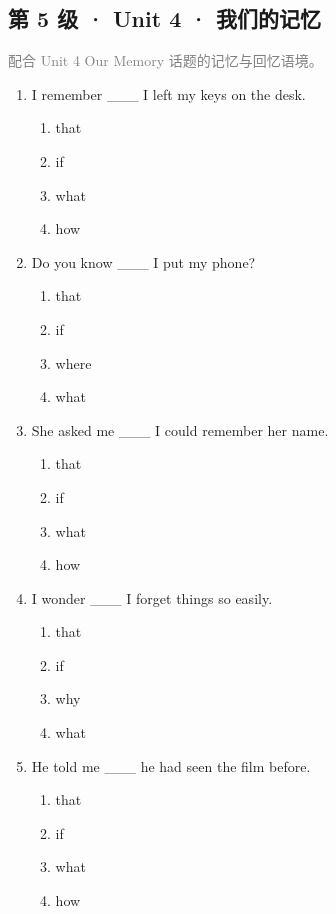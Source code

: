 \documentclass[11pt,a4paper]{ctexart}
\begin{document}
\subsection*{第 5 级 · Unit 4 · 我们的记忆}
\noindent\textcolor{gray}{配合 Unit 4 Our Memory 话题的记忆与回忆语境。}\par\smallskip
\begin{enumerate}[leftmargin=*,itemsep=4pt]
\item I remember \_\_\_ I left my keys on the desk.
\begin{enumerate}[label=\Alph*.,leftmargin=2em,itemsep=1pt,topsep=2pt]
\item that
\item if
\item what
\item how
\end{enumerate}
\item Do you know \_\_\_ I put my phone?
\begin{enumerate}[label=\Alph*.,leftmargin=2em,itemsep=1pt,topsep=2pt]
\item that
\item if
\item where
\item what
\end{enumerate}
\item She asked me \_\_\_ I could remember her name.
\begin{enumerate}[label=\Alph*.,leftmargin=2em,itemsep=1pt,topsep=2pt]
\item that
\item if
\item what
\item how
\end{enumerate}
\item I wonder \_\_\_ I forget things so easily.
\begin{enumerate}[label=\Alph*.,leftmargin=2em,itemsep=1pt,topsep=2pt]
\item that
\item if
\item why
\item what
\end{enumerate}
\item He told me \_\_\_ he had seen the film before.
\begin{enumerate}[label=\Alph*.,leftmargin=2em,itemsep=1pt,topsep=2pt]
\item that
\item if
\item what
\item how

\end{enumerate}
\end{enumerate}
\end{document}
